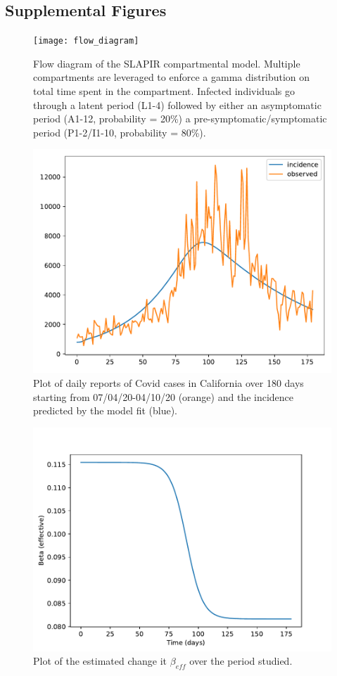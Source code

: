 \documentclass[11pt]{article}
\begin{document}
\subsection{Supplemental Figures}
    \begin{figure}
        \centering
        \texttt{[image: flow\_diagram]}
        \caption{Flow diagram of the SLAPIR compartmental model. Multiple compartments are leveraged to enforce a gamma 
        distribution on total time spent in the compartment.  Infected individuals go through a latent period (L1-4) followed by
        either an asymptomatic period (A1-12, probability = 20\%) a pre-symptomatic/symptomatic period (P1-2/I1-10, probability = 80\%).}
        \label{flow_diagram}
    \end{figure}
    \begin{figure}
        \centering
        \includegraphics[scale=0.75]{model_fit}
        \caption{Plot of daily reports of Covid cases in California over 180 days starting from 07/04/20-04/10/20 (orange) 
        and the incidence predicted by the model fit (blue).}
        \label{model_fit}
    \end{figure}
    \begin{figure}
        \centering
        \includegraphics[scale=0.75]{beta_over_time}
        \caption{Plot of the estimated change it $\beta_{eff}$ over the period studied.}
        \label{beta_over_time}
    \end{figure}
\end{document}
